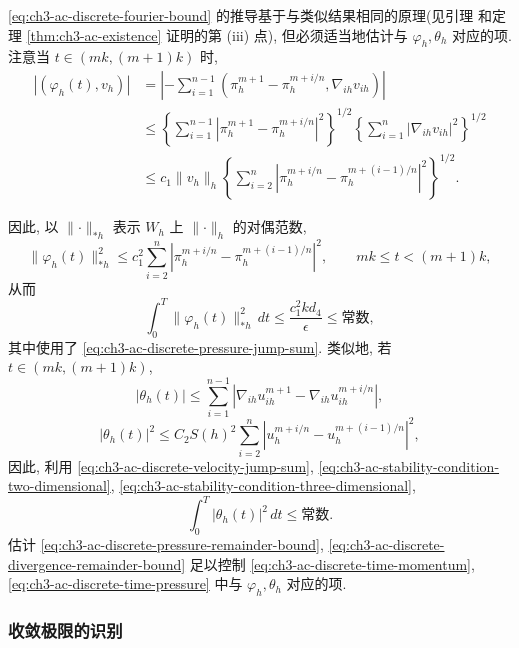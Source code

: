 \begin{Proof}
\eqref{eq:ch3-ac-discrete-fourier-bound} 的推导基于与类似结果相同的原理(见引理  和定理 \ref{thm:ch3-ac-existence} 证明的第 (iii) 点), 但必须适当地估计与 $\varphi_h,\theta_h$ 对应的项. 注意当 $t\in(mk,(m+1)k)$ 时,
\[
\begin{aligned}
|(\varphi_h(t),v_h)|
&=\left|-\sum_{i=1}^{n-1}
(\pi_h^{m+1}-\pi_h^{m+i/n},\nabla_{ih}v_{ih})\right|\\
&\leq\left\{\sum_{i=1}^{n-1}
|\pi_h^{m+1}-\pi_h^{m+i/n}|^2\right\}^{1/2}
\left\{\sum_{i=1}^n|\nabla_{ih}v_{ih}|^2\right\}^{1/2}\\
&\leq c_1\lVert v_h\rVert_h
\left\{\sum_{i=2}^n
|\pi_h^{m+i/n}-\pi_h^{m+(i-1)/n}|^2\right\}^{1/2}.
\end{aligned}
\]

\hypertarget{chapter-03-page-323}{}
因此, 以 $\lVert\cdot\rVert_{*h}$ 表示 $W_h$ 上 $\lVert\cdot\rVert_h$ 的对偶范数,
\[
\lVert\varphi_h(t)\rVert_{*h}^2
\leq c_1^2\sum_{i=2}^n
|\pi_h^{m+i/n}-\pi_h^{m+(i-1)/n}|^2,
\qquad mk\leq t<(m+1)k,
\]
从而
\begin{equation}
\int_0^T\lVert\varphi_h(t)\rVert_{*h}^2\,dt
\leq\frac{c_1^2kd_4}{\epsilon}
\leq\text{常数},
\label{eq:ch3-ac-discrete-pressure-remainder-bound}
\end{equation}
其中使用了 \eqref{eq:ch3-ac-discrete-pressure-jump-sum}. 类似地, 若 $t\in(mk,(m+1)k)$,
\[
|\theta_h(t)|
\leq\sum_{i=1}^{n-1}
|\nabla_{ih}u_{ih}^{m+1}-\nabla_{ih}u_{ih}^{m+i/n}|,
\]
\[
|\theta_h(t)|^2
\leq C_2S(h)^2\sum_{i=2}^n
|u_h^{m+i/n}-u_h^{m+(i-1)/n}|^2,
\]
因此, 利用 \eqref{eq:ch3-ac-discrete-velocity-jump-sum}, \eqref{eq:ch3-ac-stability-condition-two-dimensional}, \eqref{eq:ch3-ac-stability-condition-three-dimensional},
\begin{equation}
\int_0^T|\theta_h(t)|^2\,dt\leq\text{常数}.
\label{eq:ch3-ac-discrete-divergence-remainder-bound}
\end{equation}
估计 \eqref{eq:ch3-ac-discrete-pressure-remainder-bound}, \eqref{eq:ch3-ac-discrete-divergence-remainder-bound} 足以控制 \eqref{eq:ch3-ac-discrete-time-momentum}, \eqref{eq:ch3-ac-discrete-time-pressure} 中与 $\varphi_h,\theta_h$ 对应的项.
\end{Proof}

\subsubsection{收敛极限的识别}
\label{subsubsec:ch3-ac-convergence-identification}

